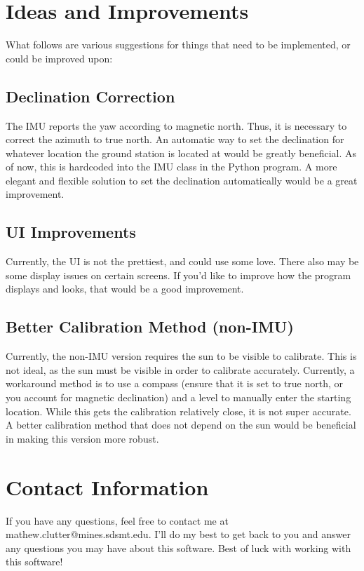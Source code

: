 \documentclass{article}
\begin{document}
\section{Ideas and Improvements}
What follows are various suggestions for things that need to be implemented, or could be improved upon:

\subsection{Declination Correction}
The IMU reports the yaw according to magnetic north. Thus, it is necessary to correct the azimuth to true north. An automatic way to set the declination for whatever location the ground station is located at would be greatly beneficial. As of now, this is hardcoded into the IMU class in the Python program. A more elegant and flexible solution to set the declination automatically would be a great improvement.

\subsection{UI Improvements}
Currently, the UI is not the prettiest, and could use some love. There also may be some  display issues on certain screens. If you'd like to improve how the program displays and looks, that would be a good improvement. 

\subsection{Better Calibration Method (non-IMU)}
Currently, the non-IMU version requires the sun to be visible to calibrate. This is not ideal, as the sun must be visible in order to calibrate accurately. Currently, a workaround method is to use a compass (ensure that it is set to true north, or you account for magnetic declination) and a level to manually enter the starting location. While this gets the calibration relatively close, it is not super accurate. A better calibration method that does not depend on the sun would be beneficial in making this version more robust.

\section{Contact Information}
If you have any questions, feel free to contact me at mathew.clutter@mines.sdsmt.edu. I'll do my best to get back to you and answer any questions you may have about this software. Best of luck with working with this software!
\end{document}
